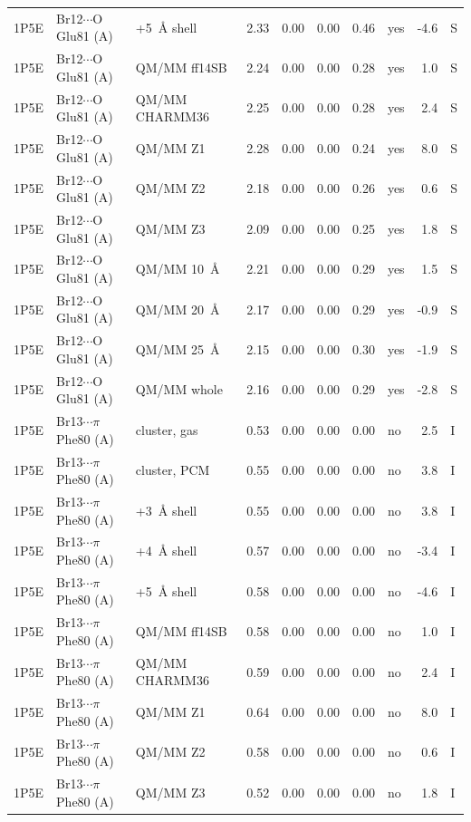 {\begin{longtable}{lllrrrrlrl}
1P5E & Br12$\cdots$O Glu81 (A) & +5~\AA{} shell & 2.33 & 0.00 & 0.00 & 0.46 & yes & -4.6 & S\\
1P5E & Br12$\cdots$O Glu81 (A) & QM/MM ff14SB & 2.24 & 0.00 & 0.00 & 0.28 & yes & 1.0 & S\\
1P5E & Br12$\cdots$O Glu81 (A) & QM/MM CHARMM36 & 2.25 & 0.00 & 0.00 & 0.28 & yes & 2.4 & S\\
1P5E & Br12$\cdots$O Glu81 (A) & QM/MM Z1 & 2.28 & 0.00 & 0.00 & 0.24 & yes & 8.0 & S\\
1P5E & Br12$\cdots$O Glu81 (A) & QM/MM Z2 & 2.18 & 0.00 & 0.00 & 0.26 & yes & 0.6 & S\\
1P5E & Br12$\cdots$O Glu81 (A) & QM/MM Z3 & 2.09 & 0.00 & 0.00 & 0.25 & yes & 1.8 & S\\
1P5E & Br12$\cdots$O Glu81 (A) & QM/MM 10~\AA{} & 2.21 & 0.00 & 0.00 & 0.29 & yes & 1.5 & S\\
1P5E & Br12$\cdots$O Glu81 (A) & QM/MM 20~\AA{} & 2.17 & 0.00 & 0.00 & 0.29 & yes & -0.9 & S\\
1P5E & Br12$\cdots$O Glu81 (A) & QM/MM 25~\AA{} & 2.15 & 0.00 & 0.00 & 0.30 & yes & -1.9 & S\\
1P5E & Br12$\cdots$O Glu81 (A) & QM/MM whole & 2.16 & 0.00 & 0.00 & 0.29 & yes & -2.8 & S\\
1P5E & Br13$\cdots$$\pi$ Phe80 (A) & cluster, gas & 0.53 & 0.00 & 0.00 & 0.00 & no & 2.5 & I\\
1P5E & Br13$\cdots$$\pi$ Phe80 (A) & cluster, PCM & 0.55 & 0.00 & 0.00 & 0.00 & no & 3.8 & I\\
1P5E & Br13$\cdots$$\pi$ Phe80 (A) & +3~\AA{} shell & 0.55 & 0.00 & 0.00 & 0.00 & no & 3.8 & I\\
1P5E & Br13$\cdots$$\pi$ Phe80 (A) & +4~\AA{} shell & 0.57 & 0.00 & 0.00 & 0.00 & no & -3.4 & I\\
1P5E & Br13$\cdots$$\pi$ Phe80 (A) & +5~\AA{} shell & 0.58 & 0.00 & 0.00 & 0.00 & no & -4.6 & I\\
1P5E & Br13$\cdots$$\pi$ Phe80 (A) & QM/MM ff14SB & 0.58 & 0.00 & 0.00 & 0.00 & no & 1.0 & I\\
1P5E & Br13$\cdots$$\pi$ Phe80 (A) & QM/MM CHARMM36 & 0.59 & 0.00 & 0.00 & 0.00 & no & 2.4 & I\\
1P5E & Br13$\cdots$$\pi$ Phe80 (A) & QM/MM Z1 & 0.64 & 0.00 & 0.00 & 0.00 & no & 8.0 & I\\
1P5E & Br13$\cdots$$\pi$ Phe80 (A) & QM/MM Z2 & 0.58 & 0.00 & 0.00 & 0.00 & no & 0.6 & I\\
1P5E & Br13$\cdots$$\pi$ Phe80 (A) & QM/MM Z3 & 0.52 & 0.00 & 0.00 & 0.00 & no & 1.8 & I\\

\end{longtable}}
